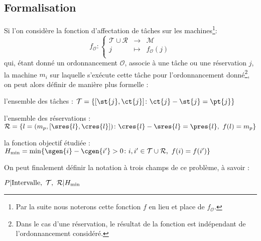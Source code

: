 \documentclass[a4paper,9pt]{report}
\begin{document}
\subsection{Formalisation}
    Si l'on considère la fonction d'affectation de tâches sur les machines\footnote{Par la suite
    nous noterons cette fonction $f$ en lieu et place de $f_{\mathcal{O}}$.}: \[
        f_{\mathcal{O}} : \left \lbrace \begin{array}{rcl}
            \mathcal{T} \cup \mathcal{R} & \longrightarrow & \mathcal{M} \\
            j & \mapsto & f_{\mathcal{O}}(j) \\
        \end{array}
        \right .
    \]
    qui, étant donné un ordonnancement $\mathcal{O}$, associe à une tâche ou une réservation $j$, la
    machine $m_i$ sur laquelle s'exécute cette tâche pour l'ordonnancement donné\footnote{Dans le
    cas d'une réservation, le résultat de la fonction est indépendant de l'ordonnancement
    considéré.}, on peut alors définir de manière plus formelle : \begin{bitemize}
        \item l'ensemble des tâches : \hfill $ \mathcal{T} = \{[\st{j}, \ct{j}]   \colon  
            \ct{j} - \st{j} = \pt{j} \} $
        \item l'ensemble des réservations : \hfill $\mathcal{R} = \{l = (m_p, [\sres{l}, \cres{l}])  
            \colon   \cres{l} - \sres{l} = \pres{l},\ f(l) = m_p\}$
        \item la fonction objectif étudiée : \hfill $H_{\min} = \min \{ \sgen{i} - \cgen{i'} > 0  
            \colon   i,i' \in \mathcal{T} \cup \mathcal{R},\ f(i) = f(i')\}$
    \end{bitemize}

    On peut finalement définir la notation à trois champs de ce problème, à savoir : 
    \begin{center}
        $P \arrowvert \mbox{Intervalle},\ \mathcal{T},\ \mathcal{R} \arrowvert H_{\min}$
    \end{center}
    

\end{document}
